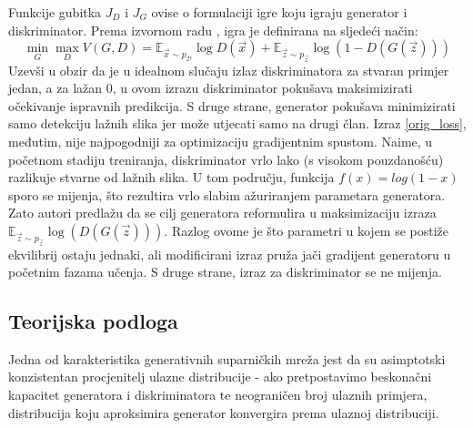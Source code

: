 Funkcije gubitka $J_D$ i $J_G$ ovise o formulaciji igre koju igraju generator i diskriminator. Prema izvornom radu , igra je definirana na sljedeći način:
\begin{equation}
\label{orig_loss}
\min_G \max_D V(G, D) = \mathbb{E}_{\vec{x} \sim p_{\mathcal{D}}}\log D(\vec{x}) + \mathbb{E}_{\vec{z} \sim p_{\vec{z}}} \log (1 - D(G(\vec{z})))
\end{equation}
Uzevši u obzir da je u idealnom slučaju izlaz diskriminatora za stvaran primjer jedan, a za lažan 0, u ovom izrazu diskriminator pokušava maksimizirati očekivanje ispravnih predikcija. S druge strane, generator pokušava minimizirati samo detekciju lažnih slika jer može utjecati samo na drugi član. Izraz \ref{orig_loss}, međutim, nije najpogodniji za optimizaciju gradijentnim spustom. Naime, u početnom stadiju treniranja, diskriminator vrlo lako (s visokom pouzdanošću) razlikuje stvarne od lažnih slika. U tom području, funkcija $f(x) = log(1 - x)$ sporo se mijenja, što rezultira vrlo slabim ažuriranjem parametara generatora. Zato autori predlažu da se cilj generatora reformulira u maksimizaciju izraza $\mathbb{E}_{\vec{z} \sim p_{\vec{z}}} \log (D(G(\vec{z})))$. Razlog ovome je što parametri u kojem se postiže ekvilibrij ostaju jednaki, ali modificirani izraz pruža jači gradijent generatoru u početnim fazama učenja. S druge strane, izraz za diskriminator se ne mijenja. 

\subsection{Teorijska podloga}
Jedna od karakteristika generativnih suparničkih mreža jest da su asimptotski konzistentan procjenitelj ulazne distribucije - ako pretpostavimo beskonačni kapacitet generatora i diskriminatora te neograničen broj ulaznih primjera, distribucija koju aproksimira generator konvergira prema ulaznoj distribuciji.

